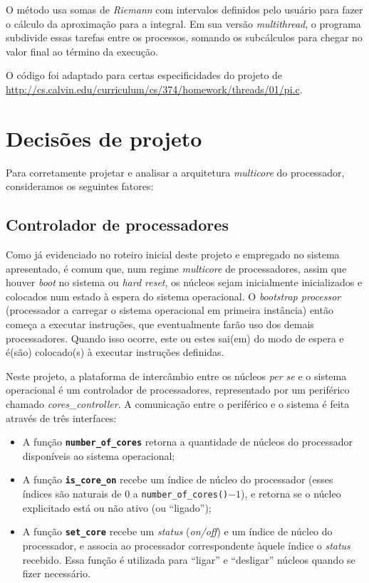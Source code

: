 \documentclass[11pt, a4paper]{article}
\begin{document}
O método usa somas de \textit{Riemann} com intervalos definidos pelo usuário para fazer o cálculo da aproximação para a integral. Em sua versão \textit{multithread}, o programa subdivide essas tarefas entre os processos, somando os subcálculos para chegar no valor final ao término da execução.

O código foi adaptado para certas especificidades do projeto de \url{http://cs.calvin.edu/curriculum/cs/374/homework/threads/01/pi.c}.

\section{Decisões de projeto}

Para corretamente projetar e analisar a arquitetura \textit{multicore} do processador, consideramos os seguintes fatores:

\subsection{Controlador de processadores}

Como já evidenciado no roteiro inicial deste projeto e empregado no sistema apresentado, é comum que, num regime \textit{multicore} de processadores, assim que houver \textit{boot} no sistema ou \textit{hard reset}, os núcleos sejam inicialmente inicializados e colocados num estado à espera do sistema operacional. O \textit{bootstrap processor} (processador a carregar o sistema operacional em primeira instância) então começa a executar instruções, que eventualmente farão uso dos demais processadores. Quando isso ocorre, este ou estes sai(em) do modo de espera e é(são) colocado(s) à executar instruções definidas.

Neste projeto, a plataforma de intercâmbio entre os núcleos \textit{per se} e o sistema operacional é um controlador de processadores, representado por um periférico chamado \textit{cores\_controller}. A comunicação entre o periférico e o sistema é feita através de três interfaces:

\begin{itemize}
\item A função \textbf{\texttt{number\_of\_cores}} retorna a quantidade de núcleos do processador disponíveis ao sistema operacional;
\item A função \textbf{\texttt{is\_core\_on}} recebe um índice de núcleo do processador (esses índices são naturais de $0$ a \texttt{number\_of\_cores()}$ - 1$), e retorna se o núcleo explicitado está ou não ativo (ou ``ligado'');
\item A função \textbf{\texttt{set\_core}} recebe um \textit{status} (\textit{on/off}) e um índice de núcleo do processador, e associa ao processador correspondente àquele índice o \textit{status} recebido. Essa função é utilizada para ``ligar'' e ``desligar'' núcleos quando se fizer necessário.
\end{itemize}
\end{document}
